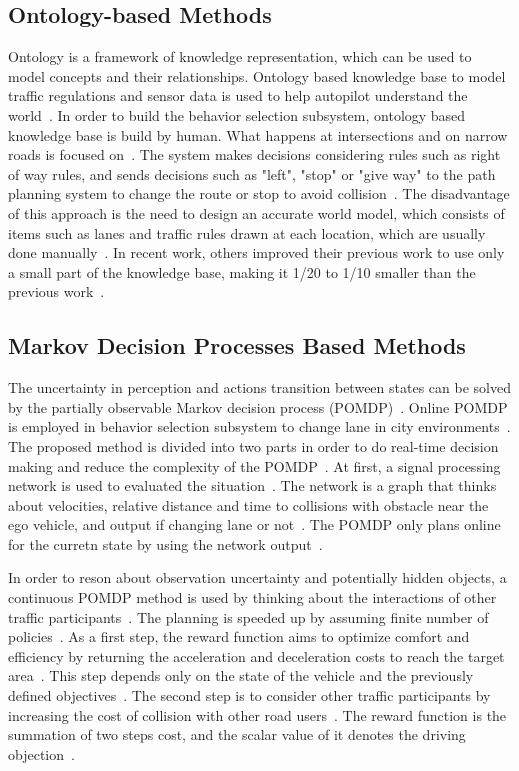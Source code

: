 \documentclass[conference]{IEEEtran}
\begin{document}
\subsection{Ontology-based Methods}
Ontology is a framework of knowledge representation, which can be used to model concepts and their relationships. Ontology based knowledge base to model traffic regulations and sensor data is used to help autopilot understand the world~\cite{Zhao2015ontology}. In order to build the behavior selection subsystem, ontology based knowledge base is build by human. What happens at intersections and on narrow roads is focused on~\cite{Zhao2015ontology}. The system makes decisions considering rules such as right of way rules, and sends decisions such as "left", "stop" or "give way" to the path planning system to change the route or stop to avoid collision~\cite{Zhao2015ontology}. The disadvantage of this approach is the need to design an accurate world model, which consists of items such as lanes and traffic rules drawn at each location, which are usually done manually~\cite{Zhao2015ontology}. In recent work, others improved their previous work to use only a small part of the knowledge base, making it 1/20 to 1/10 smaller than the previous work~\cite{Zhao20171425}.

\subsection{Markov Decision Processes Based Methods}
The uncertainty in perception and actions transition between states can be solved by the partially observable Markov decision process (POMDP)~\cite{self_driving}. Online POMDP is employed in behavior selection subsystem to change lane in city environments~\cite{Ulbrich2013}. The proposed method is divided into two parts in order to do real-time decision making and reduce the complexity of the POMDP~\cite{Ulbrich2013}. At first, a signal processing network is used to evaluated the situation~\cite{Ulbrich2013}. The network is a graph that thinks about velocities, relative distance and time to collisions with obstacle near the ego vehicle, and output if changing lane or not~\cite{Ulbrich2013}. The POMDP only plans online for the curretn state by using the network output~\cite{Ulbrich2013}.

In order to reson about observation uncertainty and potentially hidden objects, a continuous POMDP method is used by thinking about the interactions of other traffic participants~\cite{Brechtel2014392}. The planning is speeded up by assuming finite number of policies~\cite{Brechtel2014392}. As a first step, the reward function aims to optimize comfort and efficiency by returning the acceleration and deceleration costs to reach the target area~\cite{Brechtel2014392}. This step depends only on the state of the vehicle and the previously defined objectives~\cite{Brechtel2014392}. The second step is to consider other traffic participants by increasing the cost of collision with other road users~\cite{Brechtel2014392}. The reward function is the summation of two steps cost, and the scalar value of it denotes the driving objection~\cite{Brechtel2014392}.
\end{document}
